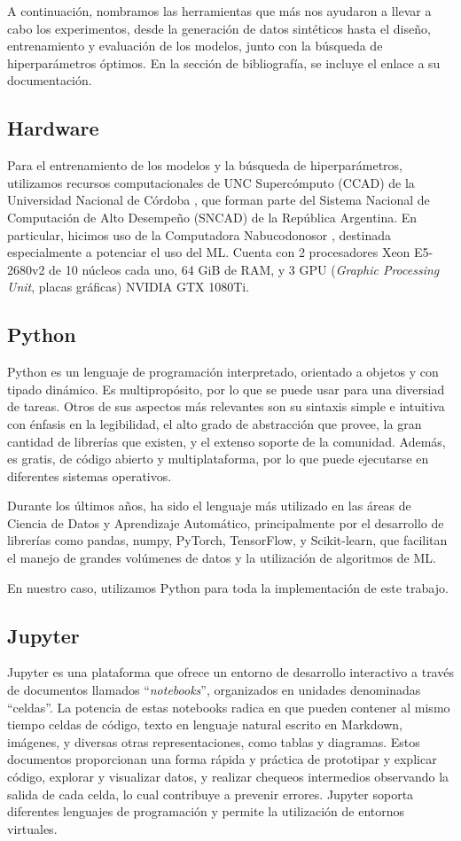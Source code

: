 \documentclass[../../main.tex]{subfiles}
\begin{document}
A continuación, nombramos las herramientas que más nos ayudaron a llevar a cabo los
experimentos, desde la generación de datos sintéticos hasta el diseño, entrenamiento y
evaluación de los modelos, junto con la búsqueda de hiperparámetros óptimos. En la
sección de bibliografía, se incluye el enlace a su documentación.

\subsection{Hardware}
Para el entrenamiento de los modelos y la búsqueda de hiperparámetros, utilizamos recursos
computacionales de UNC Supercómputo (CCAD) de la Universidad Nacional de Córdoba
\cite{ccad}, que forman parte del Sistema Nacional de Computación de Alto Desempeño
(SNCAD) de la República Argentina. En particular, hicimos uso de la Computadora
Nabucodonosor \cite{nabu}, destinada especialmente a potenciar el uso del ML. Cuenta con 2
procesadores Xeon E5-2680v2 de 10 núcleos cada uno, 64 GiB de RAM, y 3 GPU
(\textit{Graphic Processing Unit}, placas gráficas) NVIDIA GTX 1080Ti.

\subsection{Python}
Python \cite{python-docs} es un lenguaje de programación interpretado, orientado a objetos
y con tipado dinámico. Es multipropósito, por lo que se puede usar para una diversiad de
tareas. Otros de sus aspectos más relevantes son su sintaxis simple e intuitiva con
énfasis en la legibilidad, el alto grado de abstracción que provee, la gran cantidad de
librerías que existen, y el extenso soporte de la comunidad. Además, es gratis, de código
abierto y multiplataforma, por lo que puede ejecutarse en diferentes sistemas operativos.

Durante los últimos años, ha sido el lenguaje más utilizado en las áreas de Ciencia
de Datos y Aprendizaje Automático, principalmente por el desarrollo de librerías
como pandas, numpy, PyTorch, TensorFlow, y Scikit-learn, que facilitan el manejo
de grandes volúmenes de datos y la utilización de algoritmos de ML.

En nuestro caso, utilizamos Python para toda la implementación de este trabajo.

\subsection{Jupyter}
Jupyter \cite{jupyter-docs} es una plataforma que ofrece un entorno de desarrollo
interactivo a través de documentos llamados ``\textit{notebooks}'', organizados en
unidades denominadas ``celdas''. La potencia de estas notebooks radica en que pueden
contener al mismo tiempo celdas de código, texto en lenguaje natural escrito en Markdown,
imágenes, y diversas otras representaciones, como tablas y diagramas. Estos documentos
proporcionan una forma rápida y práctica de prototipar y explicar código, explorar y
visualizar datos, y realizar chequeos intermedios observando la salida de cada celda, lo
cual contribuye a prevenir errores. Jupyter soporta diferentes lenguajes de programación y
permite la utilización de entornos virtuales.
\end{document}
